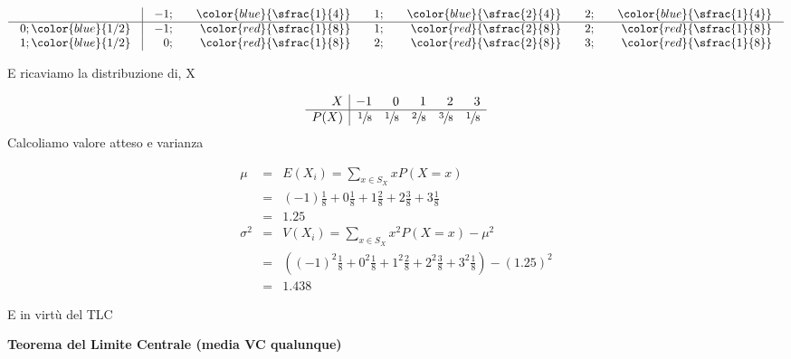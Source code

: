 \documentclass[
  11pt,
]{book}
\theoremstyle{mytheoremstyle}
\theoremstyle{mydefstyle}
\newenvironment{sol}
  {
  \begin{tcolorbox}[enhanced,breakable,arc=0.1mm,boxrule=1pt,colback=white,colframe=iblue,
  title=\bf \fontfamily{lmss}\selectfont \hspace{.5 cm} Soluzione,drop fuzzy shadow]

}{
\end{tcolorbox}
  }
\begin{document}
\begin{sol}

\normalsize

\[\arraycolsep=10pt\def\arraystretch{1}\begin{array}{ r|rrrrrr }
& -1 ;&\color{blue}{ \sfrac{ 1 } { 4 }} & 1 ;&\color{blue}{ \sfrac{ 2 } { 4 }} & 2 ;&\color{blue}{ \sfrac{ 1 } { 4 }} \\ 
\hline 
0 ;\color{blue}{ 1 / 2 }& -1;&\color{red}{\sfrac{1}{8}}& 1;&\color{red}{\sfrac{2}{8}}& 2;&\color{red}{\sfrac{1}{8}}\\ 
1 ;\color{blue}{ 1 / 2 }& 0;&\color{red}{\sfrac{1}{8}}& 2;&\color{red}{\sfrac{2}{8}}& 3;&\color{red}{\sfrac{1}{8}}\\ 
\end{array}
 \]

\normalsize E ricaviamo la distribuzione di, X

\normalsize

\[
     \begin{array}{ r|rrrrr }
 X  & -1& 0& 1& 2& 3 \\ 
 \hline 
 P( X ) & \sfrac{1}{8}& \sfrac{1}{8}& \sfrac{2}{8}& \sfrac{3}{8}& \sfrac{1}{8} \\ 
 \end{array}
 \]
\normalsize Calcoliamo valore atteso e varianza

\normalsize

\begin{eqnarray*} \mu &=& E(X_i) = \sum_{x\in S_X}x P(X=x)\\ 
 &=& ( -1 ) \frac { 1 }{ 8 }+ 0  \frac { 1 }{ 8 }+ 1  \frac { 2 }{ 8 }+ 2  \frac { 3 }{ 8 }+ 3  \frac { 1 }{ 8 } \\ 
            &=& 1.25 \\ 
 \sigma^2 &=& V(X_i) = \sum_{x\in S_X}x^2 P(X=x)-\mu^2\\ 
 &=&\left( ( -1 ) ^2\frac { 1 }{ 8 }+ 0  ^2\frac { 1 }{ 8 }+ 1  ^2\frac { 2 }{ 8 }+ 2  ^2\frac { 3 }{ 8 }+ 3  ^2\frac { 1 }{ 8 } \right)-( 1.25 )^2\\ 
            &=& 1.438 
\end{eqnarray*}
\normalsize

E in virtù del TLC

\textbf{Teorema del Limite Centrale (media VC qualunque)}


\end{sol}
\end{document}
